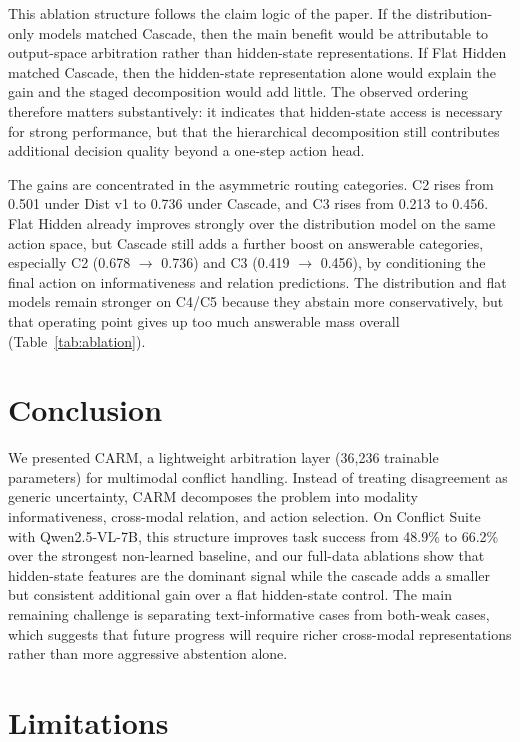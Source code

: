 \documentclass[11pt]{article}
\begin{document}
This ablation structure follows the claim logic of the paper. If the distribution-only
models matched Cascade, then the main benefit would be attributable to output-space
 arbitration rather than hidden-state representations. If Flat Hidden matched Cascade, then
the hidden-state representation alone would explain the gain and the staged decomposition
would add little. The observed ordering therefore matters substantively: it indicates that
hidden-state access is necessary for strong performance, but that the hierarchical
decomposition still contributes additional decision quality beyond a one-step action head.

The gains are concentrated in the asymmetric routing categories. C2 rises from 0.501 under
Dist v1 to 0.736 under Cascade, and C3 rises from 0.213 to 0.456. Flat Hidden already
improves strongly over the distribution model on the same action space, but Cascade still
adds a further boost on answerable categories, especially C2 (0.678 $\rightarrow$ 0.736)
and C3 (0.419 $\rightarrow$ 0.456), by conditioning the final action on
informativeness and relation predictions. The distribution and flat models remain stronger
on C4/C5 because they abstain more conservatively, but that operating point gives up too
much answerable mass overall (Table~\ref{tab:ablation}).




\section{Conclusion}
\label{sec:conclusion}

We presented CARM, a lightweight arbitration layer (36,236 trainable parameters) for multimodal conflict handling.
Instead of treating disagreement as generic uncertainty, CARM decomposes the problem into
modality informativeness, cross-modal relation, and action selection. On Conflict Suite with
Qwen2.5-VL-7B,
this structure improves task success from 48.9\% to 66.2\% over the strongest non-learned
baseline, and our full-data ablations show that hidden-state features are the dominant
signal while the cascade adds a smaller but consistent additional gain over a flat
hidden-state control. The main remaining challenge is separating
text-informative cases from both-weak cases, which suggests that future progress will
require richer cross-modal representations rather than more aggressive abstention alone.


\section*{Limitations}
\end{document}
